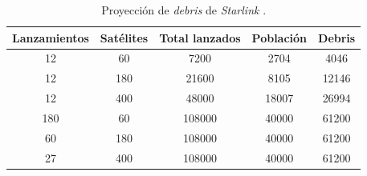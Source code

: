 \begin{table}[h]
	\centering
    \caption[Proyección de \emph{debris}]{Proyección de \emph{debris} de \emph{Starlink} \citep{ARTICLE:cibils}.}
	\begin{tabular}{c c c c c}    
		\toprule
        \textbf{Lanzamientos} & \textbf{Satélites} & \textbf{Total lanzados} & \textbf{Población} & \textbf{Debris}\\
		\midrule
        12                    & 60                 & 7200                    & 2704               & 4046\\		
        12                    & 180                & 21600                   & 8105               & 12146\\		
        12                    & 400                & 48000                   & 18007              & 26994\\		
        180                   & 60                 & 108000                  & 40000              & 61200\\		
        60                    & 180                & 108000                  & 40000              & 61200\\		
        27                    & 400                & 108000                  & 40000              & 61200\\		
		\bottomrule
		\hline
	\end{tabular}
	\label{tab:starlinkdebris}
\end{table}

\newpage

